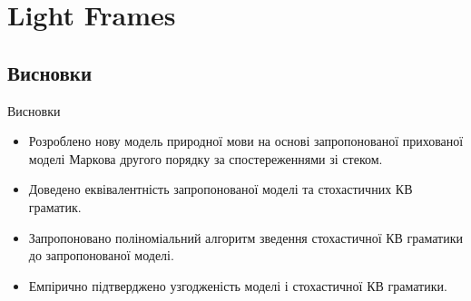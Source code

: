 \documentclass{beamer}
\begin{document}
  \section{Light Frames}
    \subsection{Висновки}
    \begin{frame}{Висновки}
      \begin{itemize}
        \item Розроблено нову модель природної мови на основі запропонованої прихованої моделі Маркова другого порядку за спостереженнями зі стеком.
        \item Доведено еквівалентність запропонованої моделі та стохастичних КВ граматик.
        \item Запропоновано поліноміальний алгоритм зведення стохастичної КВ граматики до запропонованої моделі.
        \item Емпірично підтверджено узгодженість моделі і стохастичної КВ граматики.
      \end{itemize}
    \end{frame}
\end{document}
